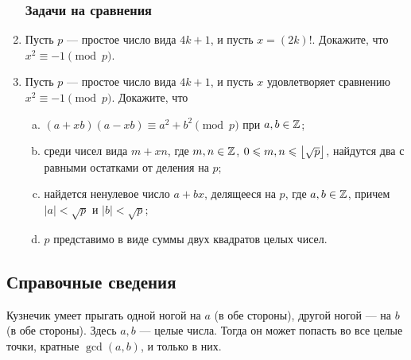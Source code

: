 \begin{enumerate}
\subsubsection*{Задачи на сравнения}

\item Пусть $p$ --- простое число вида $4k+1$, и пусть $x=(2k)!$. Докажите, что $x^2\equiv -1\pmod p$.
\item Пусть $p$ --- простое число вида $4k+1$, и пусть $x$ удовлетворяет сравнению $x^2\equiv -1\pmod p$. Докажите, что
\begin{enumerate}[a)]
\item $(a+xb)(a-xb) \equiv a^2+b^2 \pmod p$ при $a,b\in\mathbb Z$;
\item среди чисел вида $m+xn$, где $m,n\in\mathbb Z$, $0\leqslant m,n\leqslant\left\lfloor\sqrt p\right\rfloor$, найдутся два с равными остатками от деления на $p$;
\item найдется ненулевое число $a+bx$, делящееся на $p$, где $a,b\in\mathbb Z$, причем $|a|<\sqrt p$ и $|b|<\sqrt p$;
\item $p$ представимо в виде суммы двух квадратов целых чисел.
\end{enumerate}

\end{enumerate}

\subsection*{Справочные сведения}

Кузнечик умеет прыгать одной ногой на $a$ (в обе стороны), другой ногой --- на $b$ (в обе стороны). Здесь $a,b$ --- целые числа. Тогда он может попасть во все целые точки, кратные $\gcd(a,b)$, и только в них.



